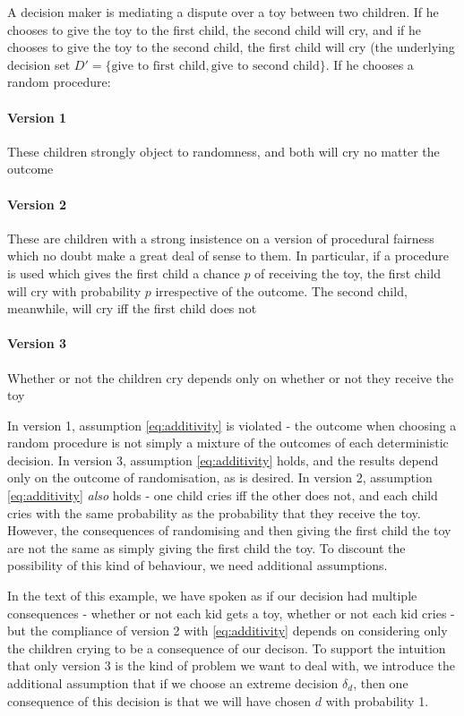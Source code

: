 \begin{example}
A decision maker is mediating a dispute over a toy between two children. If he chooses to give the toy to the first child, the second child will cry, and if he chooses to give the toy to the second child, the first child will cry (the underlying decision set $D'=\{\text{give to first child}, \text{give to second child}\}$. If he chooses a random procedure:

\paragraph{Version 1} These children strongly object to randomness, and both will cry no matter the outcome
\paragraph{Version 2} These are children with a strong insistence on a version of procedural fairness which no doubt make a great deal of sense to them. In particular, if a procedure is used which gives the first child a chance $p$ of receiving the toy, the first child will cry with probability $p$ irrespective of the outcome. The second child, meanwhile, will cry iff the first child does not
\paragraph{Version 3} Whether or not the children cry depends only on whether or not they receive the toy
\end{example}

In version 1, assumption \ref{eq:additivity} is violated - the outcome when choosing a random procedure is not simply a mixture of the outcomes of each deterministic decision. In version 3, assumption \ref{eq:additivity} holds, and the results depend only on the outcome of randomisation, as is desired. In version 2, assumption \ref{eq:additivity} \emph{also} holds - one child cries iff the other does not, and each child cries with the same probability as the probability that they receive the toy. However, the consequences of randomising and then giving the first child the toy are not the same as simply giving the first child the toy. To discount the possibility of this kind of behaviour, we need additional assumptions. 

In the text of this example, we have spoken as if our decision had multiple consequences - whether or not each kid gets a toy, whether or not each kid cries - but the compliance of version 2 with \ref{eq:additivity} depends on considering only the children crying to be a consequence of our decison. To support the intuition that only version 3 is the kind of problem we want to deal with, we introduce the additional assumption that if we choose an extreme decision $\delta_d$, then one consequence of this decision is that we will have chosen $d$ with probability 1.


